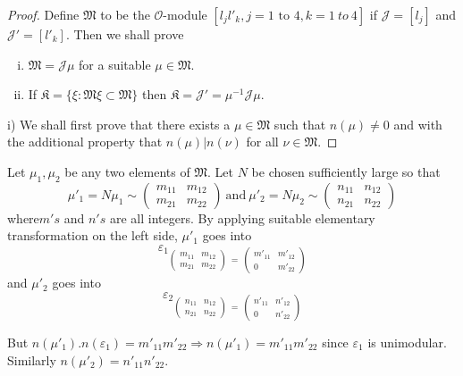 \begin{proof}
  Define $\mathfrak{M}$ to be the $\mathscr{O}$-module $[l_j  l'_k,  j
    = 1 \text{ to }4, k =1 ~ to ~ 4]$ if $\mathcal{J} = [l_j]$ and
  $\mathcal{J}'=[l'_k]$. Then we shall prove 
  \begin{enumerate}[i)]
  \item $\mathfrak{M} = \mathcal{J} \mu$ for a suitable $\mu \in \mathfrak{M}$.
  \item If $\mathfrak{K}=\{ \xi : \mathfrak{M} \xi \subset
    \mathfrak{M}\}$ then $\mathfrak{K} = \mathcal{J} ' = \mu^{-1}
    \mathcal{J} \mu$. 
  \end{enumerate}
  i) We shall first prove that there exists a $\mu \in \mathfrak{M}$
  such that $n(\mu) \neq 0$ and with the additional property that
  $n(\mu) | n(\nu)$ for all $\nu \in \mathfrak{M}$. 
\end{proof} 
 
 Let $\mu_1,  \mu_2$ be any two elements of $\mathfrak{M}$. Let $N$ be
 chosen sufficiently large so that 
 $$
 \mu'_1 = N \mu_1 \sim 
 \begin{pmatrix} 
   m_{11} & m_{12} \\ 
   m_{21} & m_{22} 
 \end{pmatrix} ~ \text{and} ~ \mu'_2 = N \mu_2 \sim 
 \begin{pmatrix}
   n_{11} & n_{12}\\ 
   n_{21} & n_{22} 
 \end{pmatrix} 
 $$
where\pageoriginale $m' s$ and $n' s$ are all integers. By applying suitable
elementary transformation on the left side, $\mu'_1$ goes into  
$$
{\varepsilon_1}
_{\begin{pmatrix} 
    m_{11} & m_{12} \\ 
    m_{21} & m_{22} 
  \end{pmatrix} ~=~ 
  \begin{pmatrix} 
    m'_{11} & m'_{12} \\
    0 &  m'_{22} 
\end{pmatrix}} 
$$
and $\mu'_2$ goes into
$$
{\varepsilon_2}
_{\begin{pmatrix} 
    n_{11} & n_{12} \\ 
    n_{21} & n_{22} 
  \end{pmatrix} ~=~ 
  \begin{pmatrix} 
    n'_{11} & n'_{12} \\
    0 & n'_{22} 
\end{pmatrix}} 
$$

But $n(\mu'_1). n(\varepsilon_1) = m'_{11} m'_{22} \Rightarrow
n(\mu'_1) = m'_{11} m'_{22}$ since $\varepsilon_1$ is
unimodular. Similarly $n(\mu'_2) = n'_{11} n'_{22}$. 

